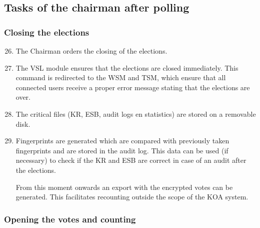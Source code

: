 \subsection{Tasks of the chairman after polling}\label{sec3:tasks-chairman-after}

\subsubsection{Closing the elections}\label{sec:closing-elections}

\begin{enumerate}
\setcounter{enumi}{25}
	\item The Chairman orders the closing of the elections.
	
	\item The VSL module ensures that the elections are closed
	immediately. This command is redirected to the WSM and TSM,
	which ensure that all connected users receive a proper
	error message stating that the elections are over.

	\item The critical files (KR, ESB, audit logs en statistics)
	are stored on a removable disk.

	\item Fingerprints are generated which are compared with
	previously taken fingerprints and are stored in the audit
	log. This data can be used (if necessary) to check if the KR
	and ESB are correct in case of an audit after the elections.

	From this moment onwards an export with the encrypted votes
	can be generated. This facilitates recounting outside the
	scope of the KOA system. 

\end{enumerate}

\subsubsection{Opening the votes and counting}\label{sec3:open-votes-count}

